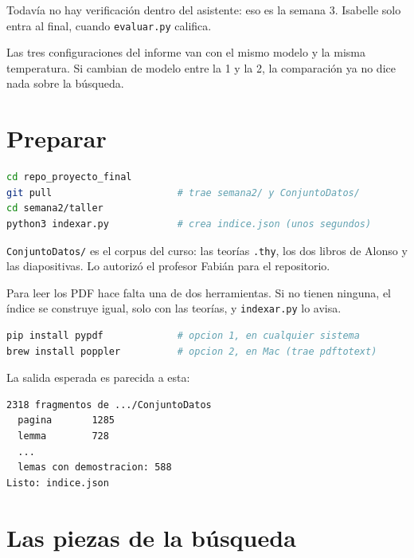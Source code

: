 \documentclass[11pt,a4paper]{article}
\newcommand{\cd}[1]{\texttt{\small #1}}
\begin{document}
Todavía no hay verificación dentro del asistente: eso es la semana 3.
Isabelle solo entra al final, cuando \cd{evaluar.py} califica.

\begin{ojo}
  Las tres configuraciones del informe van con el mismo modelo y la misma
  temperatura. Si cambian de modelo entre la 1 y la 2, la comparación ya no
  dice nada sobre la búsqueda.
\end{ojo}

\section{Preparar}

\begin{haga}
\begin{lstlisting}[language=bash]
cd repo_proyecto_final
git pull                      # trae semana2/ y ConjuntoDatos/
cd semana2/taller
python3 indexar.py            # crea indice.json (unos segundos)
\end{lstlisting}
\end{haga}

\cd{ConjuntoDatos/} es el corpus del curso: las teorías \cd{.thy}, los dos
libros de Alonso y las diapositivas. Lo autorizó el profesor Fabián para el
repositorio.

Para leer los PDF hace falta una de dos herramientas. Si no tienen
ninguna, el índice se construye igual, solo con las teorías, y
\cd{indexar.py} lo avisa.

\begin{lstlisting}[language=bash]
pip install pypdf             # opcion 1, en cualquier sistema
brew install poppler          # opcion 2, en Mac (trae pdftotext)
\end{lstlisting}

La salida esperada es parecida a esta:

\begin{lstlisting}
2318 fragmentos de .../ConjuntoDatos
  pagina       1285
  lemma        728
  ...
  lemas con demostracion: 588
Listo: indice.json
\end{lstlisting}

\section{Las piezas de la búsqueda}
\end{document}

